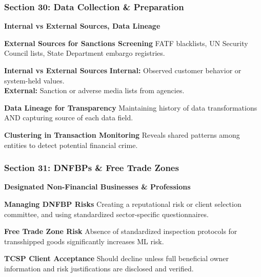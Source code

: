 \documentclass[12pt,aspectratio=169]{beamer}
\renewcommand{\scriptsize}{\fontsize{5}{6}\selectfont}
\begin{document}
	\begin{frame}
		\frametitle{\fontsize{13}{15}\selectfont \textbf{Section 30: Data Collection \& Preparation}}
		\vspace{0.3cm}
		\begin{center}
			{\fontsize{12}{14}\selectfont \textbf{Internal vs External Sources, Data Lineage}}
		\end{center}
		\vspace{0.1cm}
		\begin{block}{\textbf{External Sources for Sanctions Screening}}
			\scriptsize
			FATF blacklists, UN Security Council lists, State Department embargo registries.
		\end{block}
		\begin{block}{\textbf{Internal vs External Sources}}
			\scriptsize
			\textbf{Internal:} Observed customer behavior or system-held values. \\
			\textbf{External:} Sanction or adverse media lists from agencies.
		\end{block}
		\begin{block}{\textbf{Data Lineage for Transparency}}
			\scriptsize
			Maintaining history of data transformations AND capturing source of each data field.
		\end{block}
		\begin{block}{\textbf{Clustering in Transaction Monitoring}}
			\scriptsize
			Reveals shared patterns among entities to detect potential financial crime.
		\end{block}
	\end{frame}
	
	\begin{frame}
		\frametitle{\fontsize{13}{15}\selectfont \textbf{Section 31: DNFBPs \& Free Trade Zones}}
		\vspace{0.3cm}
		\begin{center}
			{\fontsize{12}{14}\selectfont \textbf{Designated Non-Financial Businesses \& Professions}}
		\end{center}
		\vspace{0.1cm}
		\begin{block}{\textbf{Managing DNFBP Risks}}
			\scriptsize
			Creating a reputational risk or client selection committee, and using standardized sector-specific questionnaires.
		\end{block}
		\begin{block}{\textbf{Free Trade Zone Risk}}
			\scriptsize
			Absence of standardized inspection protocols for transshipped goods significantly increases ML risk.
		\end{block}
		\begin{block}{\textbf{TCSP Client Acceptance}}
			\scriptsize
			Should decline unless full beneficial owner information and risk justifications are disclosed and verified.
		\end{block}
	\end{frame}
	
\end{document}
